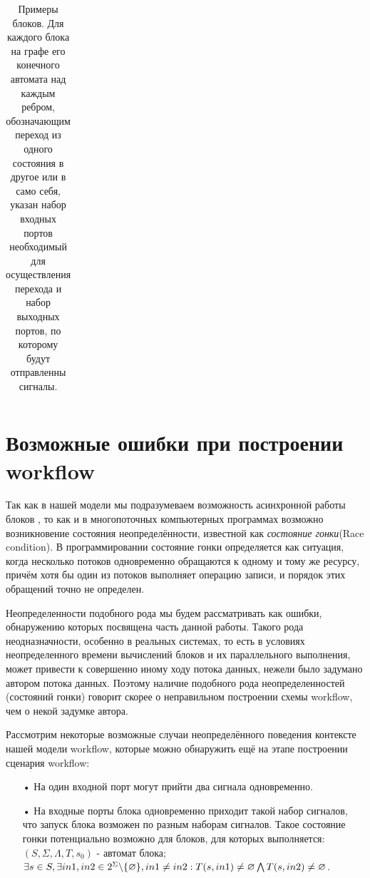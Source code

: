 \documentclass[koi8-r,usehyperref,12pt]{G7-32}
\begin{document}
\begin{table}[here]
\begin{tabular}{c|c|>{\centering}m{5cm} l}
\end{tabular}
\label{tab:blocks}
\caption{Примеры блоков. Для каждого блока на графе его конечного автомата над каждым ребром, обозначающим переход из одного состояния в другое или в само себя,  указан набор входных портов необходимый для осуществления перехода и набор выходных портов, по которому будут отправленны сигналы.}
\end{table}


\section{Возможные ошибки при построении workflow}
Так как в нашей модели мы подразумеваем возможность асинхронной работы блоков , то как и в многопоточных компьютерных программах возможно возникновение состояния неопределённости, известной как \textit{состояние гонки}(Race condition). В программировании состояние гонки определяется как ситуация, когда несколько потоков  одновременно обращаются к одному и тому же ресурсу, причём хотя бы один из потоков выполняет операцию записи, и порядок этих обращений точно не определен.

Неопределенности подобного рода мы будем рассматривать как ошибки, обнаружению которых посвящена часть данной работы. Такого рода неодназначности, особенно в реальных системах,
то есть в условиях неопределенного времени вычислений блоков и их параллельного выполнения, может привести к совершенно иному ходу потока данных, нежели было задумано автором потока данных.
Поэтому наличие подобного рода неопределенностей (состояний гонки) говорит скорее о неправильном построении схемы workflow, чем о некой задумке автора.

Рассмотрим некоторые возможные случаи неопределённого поведения контексте нашей модели workflow, которые можно обнаружить ещё на этапе построении сценария workflow:

\begin{enumerate}
\item[•] На один входной порт могут прийти два сигнала одновременно.
\item[•] На входные порты блока одновременно приходит такой набор сигналов, что запуск блока возможен по разным наборам сигналов.
Такое состояние гонки потенциально возможно для блоков, для которых выполняется:\\
$(S, \Sigma,\Lambda, T, s_{0})$  - автомат блока;\\
$ \exists s \in S , \exists in1, in2 \in 2^{\Sigma}\backslash \lbrace \varnothing \rbrace ,  in1 \neq in2 :\\  T(s, in1) \neq \varnothing   \bigwedge    T(s, in2) \neq \varnothing$.
\end{enumerate}
\end{document}

